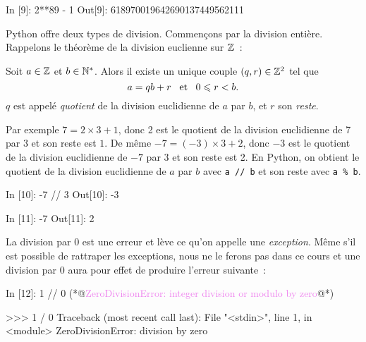 \documentclass{magnoliaold}
\begin{document}
\begin{pythoncode}
In [9]: 2**89 - 1
Out[9]: 618970019642690137449562111
\end{pythoncode}
\vspace{1ex}

Python offre deux types de division. Commençons par la division entière. Rappelons le théorème de la division euclienne sur $\mathbb{Z}$~:

\begin{proposition}
Soit $a\in\mathbb{Z}$ et $b\in{\mathbb{N}^*}$. Alors il existe un unique couple $\left(q,r\right)\in\mathbb{Z}^2$
tel que
\[a=qb+r \quad\!\text{et}\quad\! 0\leqslant r<b.\]
$q$ est appelé \emph{quotient} de la division euclidienne de $a$ par $b$, et $r$ son
\emph{reste}.
\end{proposition}

\noindent
Par exemple $7 = 2\times 3 + 1$, donc 2 est le quotient de la division
euclidienne de 7 par 3 et son reste est $1$. De même $-7 = (-3)\times 3 + 2$, donc $-3$ est
le quotient de la division euclidienne de $-7$ par 3 et son reste est 2. En Python,
on obtient le quotient de la division euclidienne de $a$ par $b$ avec
\verb_a // b_ et son reste avec \verb_a % b_.

\begin{pythoncode}
In [10]: -7 // 3
Out[10]: -3

In [11]: -7 %
Out[11]: 2
\end{pythoncode}

\noindent La division par 0 est une erreur et lève ce
qu'on appelle une \emph{exception}. Même s'il est possible de rattraper les exceptions,
nous ne le ferons pas dans ce cours et une division par 0 aura pour effet de produire
l'erreur suivante~:

\begin{francois}
\begin{pythoncode}
In [12]: 1 // 0
(*@\textcolor{violet}{ZeroDivisionError: integer division or modulo by zero}@*)
\end{pythoncode}
\end{francois}
\begin{victor}
\begin{pythoncode}
>>> 1 / 0
Traceback (most recent call last):
  File "<stdin>", line 1, in <module>
ZeroDivisionError: division by zero
\end{pythoncode}
\end{victor}

\vspace{1ex}
\end{document}
